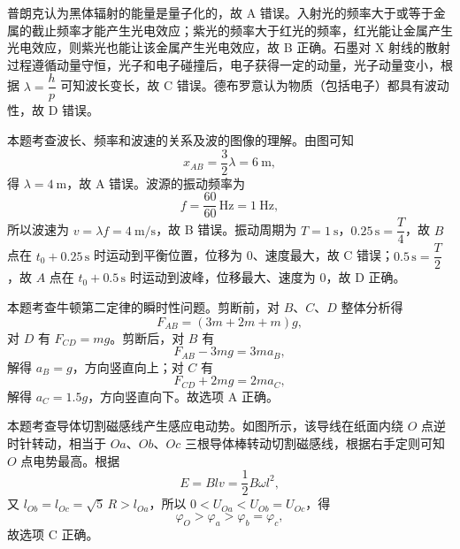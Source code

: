 
\begin{answer}
普朗克认为黑体辐射的能量是量子化的，故 A 错误。入射光的频率大于或等于金属的截止频率才能产生光电效应；紫光的频率大于红光的频率，红光能让金属产生光电效应，则紫光也能让该金属产生光电效应，故 B 正确。石墨对 X 射线的散射过程遵循动量守恒，光子和电子碰撞后，电子获得一定的动量，光子动量变小，根据 $\lambda=\dfrac{h}{p}$ 可知波长变长，故 C 错误。德布罗意认为物质（包括电子）都具有波动性，故 D 错误。
\end{answer}

\begin{answer}
本题考查波长、频率和波速的关系及波的图像的理解。由图可知
\[
  x_{AB}=\frac{3}{2}\lambda=\SI{6}{\metre},
\]
得 $\lambda=\SI{4}{\metre}$，故 A 错误。波源的振动频率为
\[
  f=\frac{60}{60}\,\si{\hertz}=\SI{1}{\hertz},
\]
所以波速为 $v=\lambda f=\SI{4}{\metre\per\second}$，故 B 错误。振动周期为 $T=\SI{1}{\second}$，$0.25\,\si{\second}=\dfrac{T}{4}$，故 $B$ 点在 $t_{0}+0.25\,\si{\second}$ 时运动到平衡位置，位移为 0、速度最大，故 C 错误；$0.5\,\si{\second}=\dfrac{T}{2}$，故 $A$ 点在 $t_{0}+0.5\,\si{\second}$ 时运动到波峰，位移最大、速度为 0，故 D 正确。

\end{answer}

\begin{answer}
本题考查牛顿第二定律的瞬时性问题。剪断前，对 $B$、$C$、$D$ 整体分析得
\[
  F_{AB}=(3m+2m+m)g,
\]
对 $D$ 有 $F_{CD}=mg$。剪断后，对 $B$ 有
\[
  F_{AB}-3mg=3ma_{B},
\]
解得 $a_{B}=g$，方向竖直向上；对 $C$ 有
\[
  F_{CD}+2mg=2ma_{C},
\]
解得 $a_{C}=1.5g$，方向竖直向下。故选项 A 正确。
\end{answer}

\begin{answer}
本题考查导体切割磁感线产生感应电动势。如图所示，该导线在纸面内绕 $O$ 点逆时针转动，相当于 $Oa$、$Ob$、$Oc$ 三根导体棒转动切割磁感线，根据右手定则可知 $O$ 点电势最高。根据
\[
  E=Blv=\frac{1}{2}B\omega l^{2},
\]
又 $l_{Ob}=l_{Oc}=\sqrt{5}\,R>l_{Oa}$，所以 $0<U_{Oa}<U_{Ob}=U_{Oc}$，得
\[
  \varphi_{O}>\varphi_{a}>\varphi_{b}=\varphi_{c},
\]
故选项 C 正确。

\end{answer}

